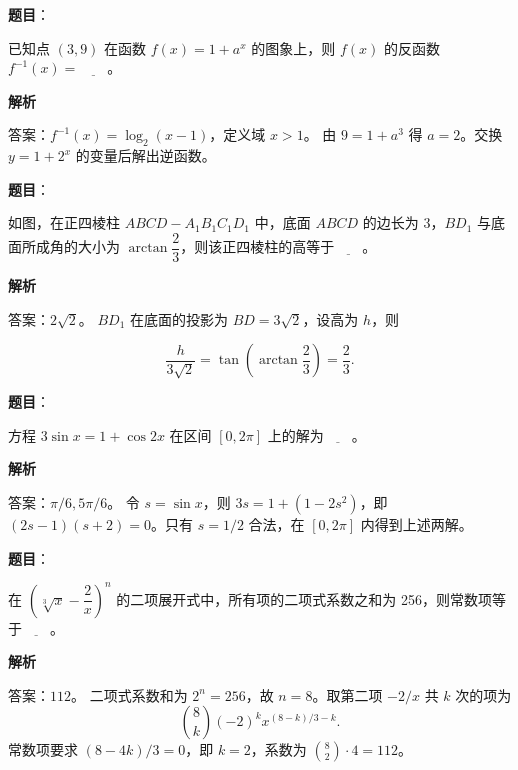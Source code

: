 \begin{answer}

\textbf{题目}：

已知点 \((3,9)\) 在函数 \(f(x)=1+a^x\) 的图象上，则 \(f(x)\) 的反函数 \(f^{-1}(x)=\)\(\underline{\qquad}\)。

\textbf{解析}

答案：\(f^{-1}(x)=\log_2(x-1)\)，定义域 \(x>1\)。
由 \(9=1+a^3\) 得 \(a=2\)。交换 \(y=1+2^x\) 的变量后解出逆函数。


\end{answer}
\begin{answer}

\textbf{题目}：

如图，在正四棱柱 \(ABCD-A_1B_1C_1D_1\) 中，底面 \(ABCD\) 的边长为 3，\(BD_1\) 与底面所成角的大小为 \(\arctan\dfrac{2}{3}\)，则该正四棱柱的高等于\(\underline{\qquad}\)。
\nopagebreak[4]
\begin{center}\end{center}
\nopagebreak[4]
\textbf{解析}

答案：\(2\sqrt2\)。
\(BD_1\) 在底面的投影为 \(BD=3\sqrt2\)，设高为 \(h\)，则 

\nopagebreak[4]
\[
\frac{h}{3\sqrt2}=\tan\left(\arctan\frac23\right)=\frac23.
\]


\end{answer}
\begin{answer}

\textbf{题目}：

方程 \(3\sin x=1+\cos 2x\) 在区间 \([0,2\pi]\) 上的解为\(\underline{\qquad}\)。

\textbf{解析}

答案：\(\pi/6,5\pi/6\)。
令 \(s=\sin x\)，则 \(3s=1+(1-2s^2)\)，即 \((2s-1)(s+2)=0\)。只有 \(s=1/2\) 合法，在 \([0,2\pi]\) 内得到上述两解。


\end{answer}
\begin{answer}

\textbf{题目}：

在 \(\left(\sqrt[3]{x}-\dfrac{2}{x}\right)^n\) 的二项展开式中，所有项的二项式系数之和为 256，则常数项等于\(\underline{\qquad}\)。

\textbf{解析}

答案：\(112\)。
二项式系数和为 \(2^n=256\)，故 \(n=8\)。取第二项 \(-2/x\) 共 \(k\) 次的项为
\nopagebreak[4]
\[
\binom8k(-2)^k x^{(8-k)/3-k}.
\]
常数项要求 \((8-4k)/3=0\)，即 \(k=2\)，系数为 \(\binom82\cdot4=112\)。


\end{answer}
